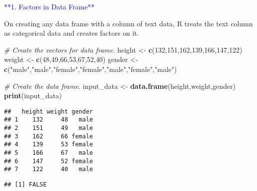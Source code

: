 \documentclass[
]{article}
\newenvironment{Shaded}{\begin{snugshade}}{\end{snugshade}}
\newcommand{\CommentTok}[1]{\textcolor[rgb]{0.56,0.35,0.01}{\textit{#1}}}
\newcommand{\DecValTok}[1]{\textcolor[rgb]{0.00,0.00,0.81}{#1}}
\newcommand{\FunctionTok}[1]{\textcolor[rgb]{0.13,0.29,0.53}{\textbf{#1}}}
\newcommand{\NormalTok}[1]{#1}
\newcommand{\OtherTok}[1]{\textcolor[rgb]{0.56,0.35,0.01}{#1}}
\newcommand{\SpecialCharTok}[1]{\textcolor[rgb]{0.81,0.36,0.00}{\textbf{#1}}}
\newcommand{\StringTok}[1]{\textcolor[rgb]{0.31,0.60,0.02}{#1}}
\begin{document}
\textcolor{blue}{**1. Factors in Data Frame**}

On creating any data frame with a column of text data, R treats the text
column as categorical data and creates factors on it.

\begin{Shaded}
\begin{Highlighting}[]
\CommentTok{\# Create the vectors for data frame.}
\NormalTok{height }\OtherTok{\textless{}{-}} \FunctionTok{c}\NormalTok{(}\DecValTok{132}\NormalTok{,}\DecValTok{151}\NormalTok{,}\DecValTok{162}\NormalTok{,}\DecValTok{139}\NormalTok{,}\DecValTok{166}\NormalTok{,}\DecValTok{147}\NormalTok{,}\DecValTok{122}\NormalTok{)}
\NormalTok{weight }\OtherTok{\textless{}{-}} \FunctionTok{c}\NormalTok{(}\DecValTok{48}\NormalTok{,}\DecValTok{49}\NormalTok{,}\DecValTok{66}\NormalTok{,}\DecValTok{53}\NormalTok{,}\DecValTok{67}\NormalTok{,}\DecValTok{52}\NormalTok{,}\DecValTok{40}\NormalTok{)}
\NormalTok{gender }\OtherTok{\textless{}{-}} \FunctionTok{c}\NormalTok{(}\StringTok{"male"}\NormalTok{,}\StringTok{"male"}\NormalTok{,}\StringTok{"female"}\NormalTok{,}\StringTok{"female"}\NormalTok{,}\StringTok{"male"}\NormalTok{,}\StringTok{"female"}\NormalTok{,}\StringTok{"male"}\NormalTok{)}

\CommentTok{\# Create the data frame.}
\NormalTok{input\_data }\OtherTok{\textless{}{-}} \FunctionTok{data.frame}\NormalTok{(height,weight,gender)}
\FunctionTok{print}\NormalTok{(input\_data)}
\end{Highlighting}
\end{Shaded}

\begin{verbatim}
##   height weight gender
## 1    132     48   male
## 2    151     49   male
## 3    162     66 female
## 4    139     53 female
## 5    166     67   male
## 6    147     52 female
## 7    122     40   male
\end{verbatim}

\begin{Shaded}
\end{Shaded}

\begin{verbatim}
## [1] FALSE
\end{verbatim}
\end{document}
